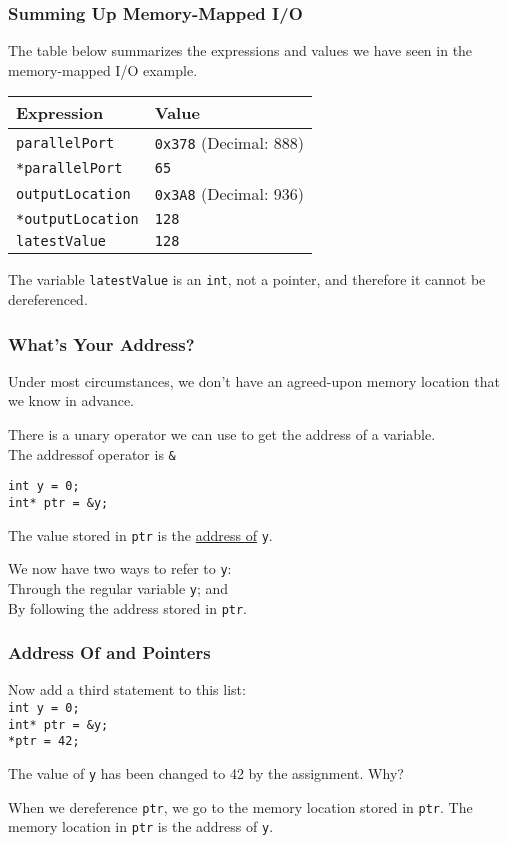 \begin{frame}
\frametitle{Summing Up Memory-Mapped I/O}

The table below summarizes the expressions and values we have seen in the memory-mapped I/O example.

\begin{center}
\begin{tabular}{l|l}
	\textbf{Expression} & \textbf{Value} \\ \hline
	\texttt{parallelPort} & \texttt{0x378} (Decimal: 888) \\ \hline
	\texttt{*parallelPort} & \texttt{65}\\ \hline
	\texttt{outputLocation} & \texttt{0x3A8} (Decimal: 936) \\ \hline
	\texttt{*outputLocation} & \texttt{128}\\ \hline
	\texttt{latestValue} & \texttt{128}\\
\end{tabular}
\end{center}

The variable \texttt{latestValue} is an \texttt{int}, not a pointer, and therefore it cannot be dereferenced.

\end{frame}

\begin{frame}
\frametitle{What's Your Address?}
Under most circumstances, we don't have an agreed-upon memory location that we know in advance.

There is a unary operator we can use to get the address of a variable.\\
\quad The addressof operator is \texttt{\&}

\texttt{int y = 0;\\
int* ptr = \&y;}

The value stored in \texttt{ptr} is the \underline{address of} \texttt{y}.

We now have two ways to refer to \texttt{y}:\\
\quad Through the regular variable \texttt{y}; and\\
\quad By following the address stored in \texttt{ptr}.

\end{frame}

\begin{frame}
\frametitle{Address Of and Pointers}

Now add a third statement to this list:\\
\texttt{int y = 0;\\
int* ptr = \&y;\\
*ptr = 42;}

The value of \texttt{y} has been changed to 42 by the assignment. Why?

When we dereference \texttt{ptr}, we go to the memory location stored in \texttt{ptr}. The memory location in \texttt{ptr} is the address of \texttt{y}.

\end{frame}

